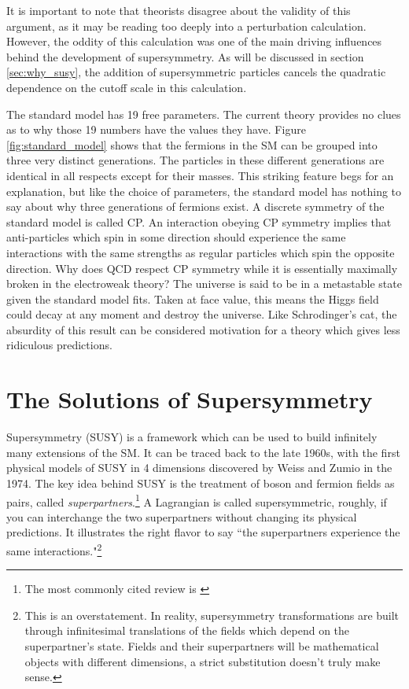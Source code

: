 \begin{enumerate}
      It is important to note that theorists disagree about the validity of this argument, as it may be reading too deeply into a perturbation calculation. However, the oddity of this calculation was one of the main driving influences behind the development of supersymmetry. As will be discussed in section \ref{sec:why_susy}, the addition of supersymmetric particles cancels the quadratic dependence on the cutoff scale in this calculation.

       The standard model has 19 free parameters. The current theory provides no clues as to why those 19 numbers have the values they have.
       Figure \ref{fig:standard_model} shows that the fermions in the SM can be grouped into three very distinct generations. The particles in these different generations are identical in all respects except for their masses. This striking feature begs for an explanation, but like the choice of parameters, the standard model has nothing to say about why three generations of fermions exist.
       A discrete symmetry of the standard model is called CP. An interaction obeying CP symmetry implies that anti-particles which spin in some direction should experience the same interactions with the same strengths as regular particles which spin the opposite direction. Why does QCD respect CP symmetry while it is essentially maximally broken in the electroweak theory?
       The universe is said to be in a metastable state given the standard model fits. Taken at face value, this means the Higgs field could decay at any moment and destroy the universe. Like Schrodinger's cat, the absurdity of this result can be considered motivation for a theory which gives less ridiculous predictions.
    \end{enumerate}                 
  
\section{The Solutions of Supersymmetry}
  Supersymmetry (SUSY) is a framework which can be used to build infinitely many extensions of the SM. It can be traced back to the late 1960s, with the first physical models of SUSY in 4 dimensions discovered by Weiss and Zumio in the 1974. \cite[ch. 24]{weinberg_SUSY} The key idea behind SUSY is the treatment of boson and fermion fields as pairs, called \emph{superpartners}.\footnote{The most commonly cited review is \cite{susy_primer}} A Lagrangian is called supersymmetric, roughly, if you can interchange the two superpartners without changing its physical predictions. It illustrates the right flavor to say ``the superpartners experience the same interactions."\footnote{This is an overstatement. In reality, supersymmetry transformations are built through infinitesimal translations of the fields which depend on the superpartner's state. Fields and their superpartners will be mathematical objects with different dimensions, a strict substitution doesn't truly make sense. }

